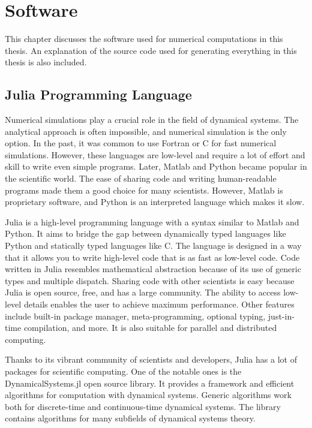 \chapter{Software}
\label{sec:software}

This chapter discusses the software used for numerical computations in this thesis.
An explanation of the source code used for generating everything in this thesis is also included.

\section{Julia Programming Language}
Numerical simulations play a crucial role in the field of dynamical systems.
The analytical approach is often impossible, and numerical simulation is the only option.
In the past, it was common to use Fortran or C for fast numerical simulations.
However, these languages are low-level and require a lot of effort and skill to write even simple programs.
Later, Matlab and Python became popular in the scientific world.
The ease of sharing code and writing human-readable programs made them a good choice for many scientists.
However, Matlab is proprietary software, and Python is an interpreted language which makes it slow.
\par
Julia is a high-level programming language with a syntax similar to Matlab and Python.
It aims to bridge the gap between dynamically typed languages like Python and statically typed languages like C.
The language is designed in a way that it allows you to write high-level code that is as fast as low-level code.
Code written in Julia resembles mathematical abstraction because of its use of generic types and multiple dispatch. 
Sharing code with other scientists is easy because Julia is open source, free, and has a large community. 
The ability to access low-level details enables the user to achieve maximum performance.
Other features include built-in package manager, meta-programming, optional typing, just-in-time compilation, and more.
It is also suitable for parallel and distributed computing.~\cite{Bezanson2017,Bezanson20181024}
\par
Thanks to its vibrant community of scientists and developers, Julia has a lot of packages for scientific computing.
One of the notable ones is the DynamicalSystems.jl open source library.
It provides a framework and efficient algorithms for computation with dynamical systems.
Generic algorithms work both for discrete-time and continuous-time dynamical systems.
The library contains algorithms for many subfields of dynamical systems theory.~\cite{Datseris2018}
